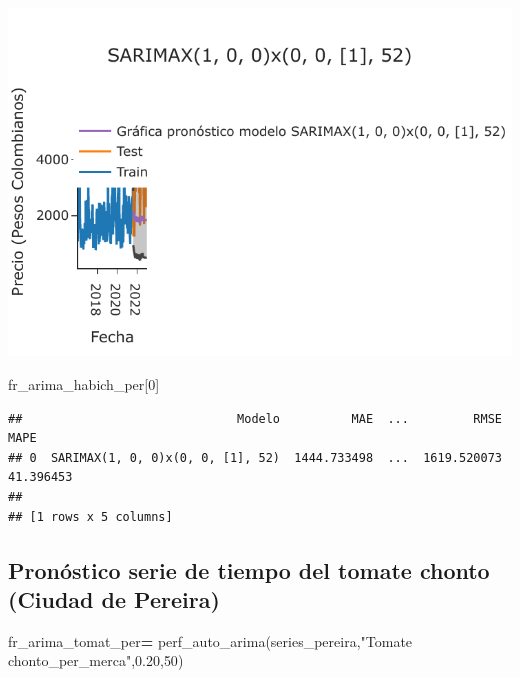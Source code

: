 \documentclass[
]{book}
\newenvironment{Shaded}{\begin{snugshade}}{\end{snugshade}}
\newcommand{\DecValTok}[1]{\textcolor[rgb]{0.00,0.00,0.81}{#1}}
\newcommand{\FloatTok}[1]{\textcolor[rgb]{0.00,0.00,0.81}{#1}}
\newcommand{\NormalTok}[1]{#1}
\newcommand{\OperatorTok}[1]{\textcolor[rgb]{0.81,0.36,0.00}{\textbf{#1}}}
\newcommand{\StringTok}[1]{\textcolor[rgb]{0.31,0.60,0.02}{#1}}
\begin{document}
\includegraphics{bookdown-demo_files/figure-latex/unnamed-chunk-167-163.pdf}

\begin{Shaded}
\begin{Highlighting}[]

\NormalTok{fr\_arima\_habich\_per[}\DecValTok{0}\NormalTok{]}
\end{Highlighting}
\end{Shaded}

\begin{verbatim}
##                              Modelo          MAE  ...         RMSE       MAPE
## 0  SARIMAX(1, 0, 0)x(0, 0, [1], 52)  1444.733498  ...  1619.520073  41.396453
## 
## [1 rows x 5 columns]
\end{verbatim}

\hypertarget{pronuxf3stico-serie-de-tiempo-del-tomate-chonto-ciudad-de-pereira-1}{%
\subsection{Pronóstico serie de tiempo del tomate chonto (Ciudad de Pereira)}\label{pronuxf3stico-serie-de-tiempo-del-tomate-chonto-ciudad-de-pereira-1}}

\begin{Shaded}
\begin{Highlighting}[]

\NormalTok{fr\_arima\_tomat\_per}\OperatorTok{=}\NormalTok{ perf\_auto\_arima(series\_pereira,}\StringTok{"Tomate chonto\_per\_merca"}\NormalTok{,}\FloatTok{0.20}\NormalTok{,}\DecValTok{50}\NormalTok{)}
\end{Highlighting}
\end{Shaded}
\end{document}
